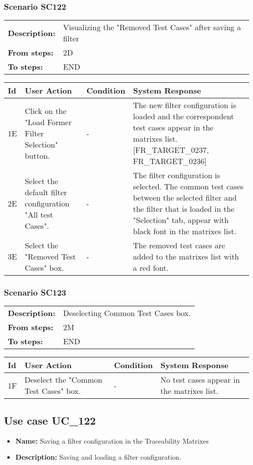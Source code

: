 \documentclass[a4paper,11pt]{article}
\newcommand{\bl}{\\ \hline}
\begin{document}
\subsubsection*{Scenario SC122}
\begin{tabular}{p{1in}p{4in}}
{\bf Description:} & Visualizing the "Removed Test Cases" after saving a
					filter \\
{\bf From steps:} & 2D \\
{\bf To steps:} & END \\
\end{tabular}
 
\begin{tabular}{|p{0.8in}|p{1.6in}|p{1.6in}|p{1.6in}|}
\hline
Id & User Action & Condition & System Response  \bl 
1E & Click on the "Load Former Filter Selection" button.
					 & - & The new filter configuration is loaded and the
						correspondent test cases appear in the matrixes list.
						[FR_TARGET_0237, FR_TARGET_0236] \bl 
2E & Select the default filter configuration "All test Cases".
					 & - & The filter configuration is selected. The common test
						cases between the selected filter and the filter that is loaded in
						the "Selection" tab, appear with black font in the matrixes list.
					 \bl 
3E & Select the "Removed Test Cases" box. & - & The removed test cases are added to the matrixes list
						with a red font. \bl 
\end{tabular}
\subsubsection*{Scenario SC123}
\begin{tabular}{p{1in}p{4in}}
{\bf Description:} & Deselecting Common Test Cases box. \\
{\bf From steps:} & 2M \\
{\bf To steps:} & END \\
\end{tabular}
 
\begin{tabular}{|p{0.8in}|p{1.6in}|p{1.6in}|p{1.6in}|}
\hline
Id & User Action & Condition & System Response  \bl 
1F & Deselect the "Common Test Cases" box. & - & No test cases appear in the matrixes list. \bl 
\end{tabular}
\subsection*{Use case UC_122}
\begin{itemize}
\item {\bf Name: }Saving a filter configuration in the Traceability Matrixes
			
\item {\bf Description: }Saving and loading a filter configuration.
\end{itemize}
\end{document}
